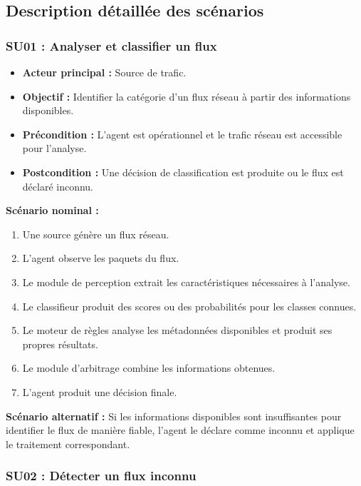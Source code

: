 \subsection{Description détaillée des scénarios}

\subsubsection{SU01 : Analyser et classifier un flux}

\begin{itemize}
    \item \textbf{Acteur principal :} Source de trafic.
    \item \textbf{Objectif :} Identifier la catégorie d'un flux
    réseau à partir des informations disponibles.
    \item \textbf{Précondition :} L'agent est opérationnel
    et le trafic réseau est accessible pour l'analyse.
    \item \textbf{Postcondition :} Une décision de classification
    est produite ou le flux est déclaré inconnu.
\end{itemize}

\textbf{Scénario nominal :}
\begin{enumerate}
    \item Une source génère un flux réseau.
    \item L'agent observe les paquets du flux.
    \item Le module de perception extrait les caractéristiques
    nécessaires à l'analyse.
    \item Le classifieur produit des scores ou des probabilités
    pour les classes connues.
    \item Le moteur de règles analyse les métadonnées
    disponibles et produit ses propres résultats.
    \item Le module d'arbitrage combine les informations
    obtenues.
    \item L'agent produit une décision finale.
\end{enumerate}

\textbf{Scénario alternatif :}
Si les informations disponibles sont insuffisantes pour
identifier le flux de manière fiable, l'agent le déclare
comme inconnu et applique le traitement correspondant.


\subsubsection{SU02 : Détecter un flux inconnu}

